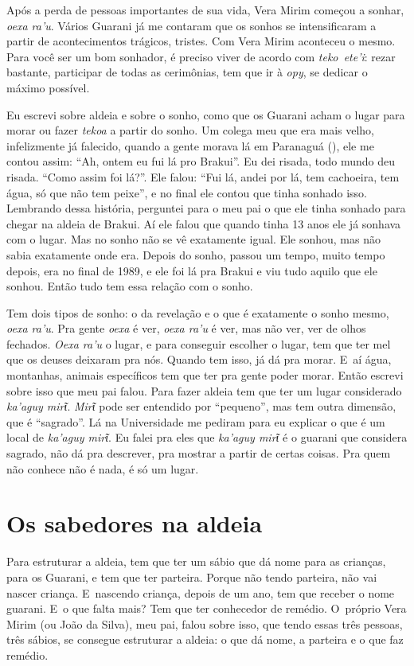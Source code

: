 Após a perda de pessoas importantes de sua vida, Vera Mirim começou a
sonhar, \emph{oexa ra’u}. Vários Guarani já me contaram que os sonhos se
intensificaram a partir de acontecimentos trágicos, tristes. Com Vera
Mirim aconteceu o mesmo. Para você ser um bom sonhador, é preciso viver
de acordo com \emph{teko~ete’i}: rezar bastante, participar de todas as
cerimônias, tem que ir à \emph{opy}, se dedicar o máximo possível.

Eu escrevi sobre aldeia e sobre o sonho, como que os Guarani acham o
lugar para morar ou fazer \emph{tekoa} a partir do sonho. Um colega meu que
era mais velho, infelizmente já falecido, quando a gente morava lá em
Paranaguá (), ele me contou assim: ``Ah, ontem eu fui lá pro Brakui''.
Eu dei risada, todo mundo deu risada. ``Como assim foi lá?''. Ele falou:
``Fui lá, andei por lá, tem cachoeira, tem água, só que não tem peixe'',
e no final ele contou que tinha sonhado isso. Lembrando dessa história,
perguntei para o meu pai o que ele tinha sonhado para chegar na aldeia
de Brakui. Aí ele falou que quando tinha 13 anos ele já sonhava com o
lugar. Mas no sonho não se vê exatamente igual. Ele sonhou, mas não
sabia exatamente onde era. Depois do sonho, passou um tempo, muito
tempo depois, era no final de 1989, e ele foi lá pra Brakui e viu tudo
aquilo que ele sonhou. Então tudo tem essa relação com o sonho.

Tem dois tipos de sonho: o da revelação e o que é exatamente o sonho
mesmo, \emph{oexa ra’u}. Pra gente \emph{oexa} é ver, \emph{oexa ra’u} é ver, mas não ver,
ver de olhos fechados. \emph{Oexa ra’u} o lugar, e para conseguir escolher o
lugar, tem que ter mel que os deuses deixaram pra nós. Quando tem isso,
já dá pra morar. E~aí água, montanhas, animais específicos tem que ter
pra gente poder morar. Então escrevi sobre isso que meu pai falou. Para
fazer aldeia tem que ter um lugar considerado \emph{ka’aguy mirῖ}. \emph{Mirῖ} pode ser
entendido por ``pequeno'', mas tem outra dimensão, que é ``sagrado''.
Lá na Universidade me pediram para eu explicar o que é um local de \emph{ka’aguy
mirῖ}. Eu falei pra eles que \emph{ka’aguy mirῖ} é o guarani que considera sagrado, não dá pra descrever, pra mostrar a partir de certas coisas.
Pra quem não conhece não é nada, é só um lugar.

\section{Os sabedores na aldeia}

Para estruturar a aldeia, tem que ter um sábio que dá nome para as
crianças, para os Guarani, e tem que ter parteira. Porque não tendo
parteira, não vai nascer criança. E~nascendo criança, depois de um ano,
tem que receber o nome guarani. E~o que falta mais? Tem que ter
conhecedor de remédio. O~próprio Vera Mirim (ou João da Silva), meu
pai, falou sobre isso, que tendo essas três pessoas, três sábios, se
consegue estruturar a aldeia: o que dá nome, a parteira e o que faz
remédio.

